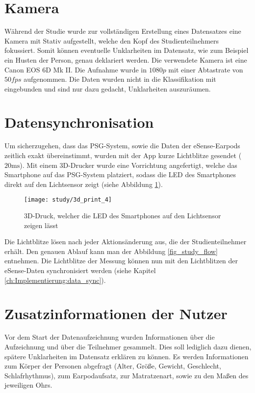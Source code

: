 \section{Kamera}
\label{ch:sa:camera}
Während der Studie wurde zur vollständigen Erstellung eines Datensatzes eine Kamera mit Stativ aufgestellt, welche den Kopf des Studienteilnehmers fokussiert. 
Somit können eventuelle Unklarheiten im Datensatz, wie zum Beispiel ein Husten der Person, genau deklariert werden. 
Die verwendete Kamera ist eine \glqq Canon EOS 6D Mk II\grqq.
Die Aufnahme wurde in $1080p$ mit einer Abtastrate von $50fps$ aufgenommen.
Die Daten wurden nicht in die Klassifikation mit eingebunden und sind nur dazu gedacht, Unklarheiten auszuräumen.

\section{Datensynchronisation}
\label{ch:sa:data_synchronisation}
Um sicherzugehen, dass das PSG-System, sowie die Daten der eSense-Earpods zeitlich exakt übereinstimmt, wurden mit der App kurze Lichtblitze gesendet ($20 \si{\ms}$).
Mit einem 3D-Drucker wurde eine Vorrichtung angefertigt, welche das Smartphone auf das PSG-System platziert, sodass die LED des Smartphones direkt auf den Lichtsensor zeigt (siehe Abbildung \ref{study:3d_print}).

\begin{figure}[ht]
    \centering
    \texttt{[image: study/3d\_print\_4]}
    \caption{3D-Druck, welcher die LED des Smartphones auf den Lichtsensor zeigen lässt}
    \label{study:3d_print}
  \end{figure}

Die Lichtblitze lösen nach jeder Aktionsänderung aus, die der Studienteilnehmer erhält. 
Den genauen Ablauf kann man der Abbildung \ref{fig_study_flow} entnehmen.
Die Lichtblitze der Messung können nun mit den Lichtblitzen der eSense-Daten synchronisiert werden (siehe Kapitel \ref{ch:Implementierung:data_sync}).

\section{Zusatzinformationen der Nutzer}
\label{ch:sa:additionalUserStudiesInformation}
Vor dem Start der Datenaufzeichnung wurden Informationen über die Aufzeichnung und über die Teilnehmer gesammelt. 
Dies soll lediglich dazu dienen, spätere Unklarheiten im Datensatz erklären zu können.
Es werden Informationen zum Körper der Personen abgefragt (Alter, Größe, Gewicht, Geschlecht, Schlafrhythmus), zum Earpodaufsatz, zur Matratzenart, sowie zu den Maßen des jeweiligen Ohrs.

